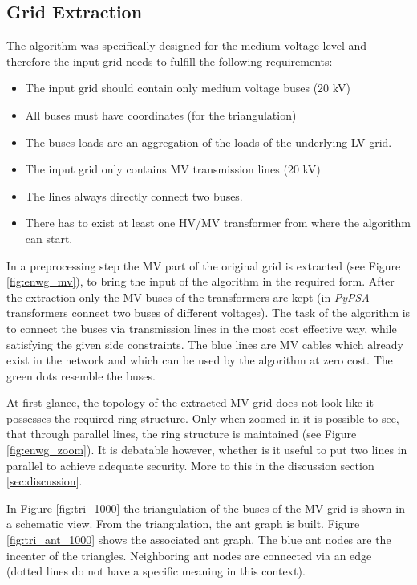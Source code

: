 \subsection{Grid Extraction}\label{sec:extraction}
The algorithm was specifically designed for the medium voltage level and therefore the input grid needs to fulfill the following requirements:
\begin{itemize}
	\setlength\itemsep{-1em}
	\item The input grid should contain only medium voltage buses (20 kV)
	\item All buses must have coordinates (for the triangulation)
	\item The buses loads are an aggregation of the loads of the underlying LV grid.
	\item The input grid only contains MV transmission lines (20 kV)
	\item The lines always directly connect two buses. 
	\item There has to exist at least one HV/MV transformer from where the algorithm can start.
\end{itemize}



In a preprocessing step the MV part of the original grid is extracted (see Figure \ref{fig:enwg_mv}), to bring the input of the algorithm in the required form. After the extraction only the MV buses of the transformers are kept (in \textit{PyPSA} transformers connect two buses of different voltages). The task of the algorithm is to connect the buses via transmission lines in the most cost effective way, while satisfying the given side constraints. The blue lines are MV cables which already exist in the network and which can be used by the algorithm at zero cost. The green dots resemble the buses.




At first glance, the topology of the extracted MV grid does not look like it possesses the required ring structure. Only when zoomed in it is possible to see, that through parallel lines, the ring structure is maintained (see Figure \ref{fig:enwg_zoom}). It is debatable however, whether is it useful to put two lines in parallel to achieve adequate security. More to this in the discussion section \ref{sec:discussion}.


%


In Figure \ref{fig:tri_1000} the triangulation of the buses of the MV grid is shown in a schematic view. From the triangulation, the ant graph is built. Figure \ref{fig:tri_ant_1000} shows the associated ant graph. The blue ant nodes are the incenter of the triangles. Neighboring ant nodes are connected via an edge (dotted lines do not have a specific meaning in this context).

